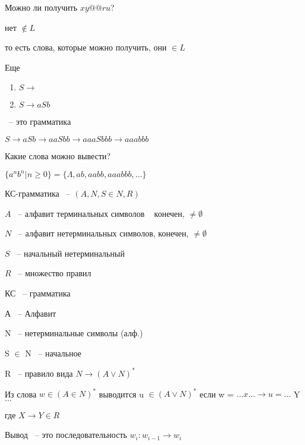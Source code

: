 \documentclass[russian]{lecture-notes}
\begin{document}
    Можно ли получить $xy@@ru$?

    нет $\notin L$

    то есть слова, которые можно получить, они $\in L$

    \begin{example}

        Еще

        \begin{enumerate}
            \item{
                $S \rightarrow$
            }
            \item{
                $S \rightarrow aSb$
            }
        \end{enumerate}

        ~-- это грамматика

        $S \rightarrow aSb \rightarrow aaSbb \rightarrow aaaSbbb \rightarrow aaabbb$

        Какие слова можно вывести?

        $\{ a^n b^n | n \geq 0\} = \{ \Lambda, ab, aabb, aaabbb, \dots  \}$
    \end{example}

    \begin{definition}
        КС-грамматика ~-- $(A, N, S \in N, R)$

        $A$ ~-- алфавит терминальных символов ~ конечен, $\neq \emptyset$

        $N$ ~-- алфавит нетерминальных символов, конечен, $\neq \emptyset$

        $S$ ~-- начальный нетерминальный

        $R$ ~-- множество правил
    \end{definition}


	КС ~-- грамматика

	А ~-- Алфавит

	N ~-- нетерминальные символы (алф.)

	S $\in$ N ~-- начальное

	R ~-- правило вида $N \rightarrow (A \lor N)^{*}$

	\begin{definition}

		Из слова $w \in ( A \in N)^{*}$ выводится u $\in (A \lor N)^{*}$ если w = $\dots x \dots \rightarrow u = \dots $ Y $\dots$

		где $X \rightarrow Y \in R$
		\end{definition}

	\begin{definition}

		Вывод ~-- это последовательность $w_{i} : w_{i-1} \rightarrow w_{i}$

		\end{definition}
\end{document}

